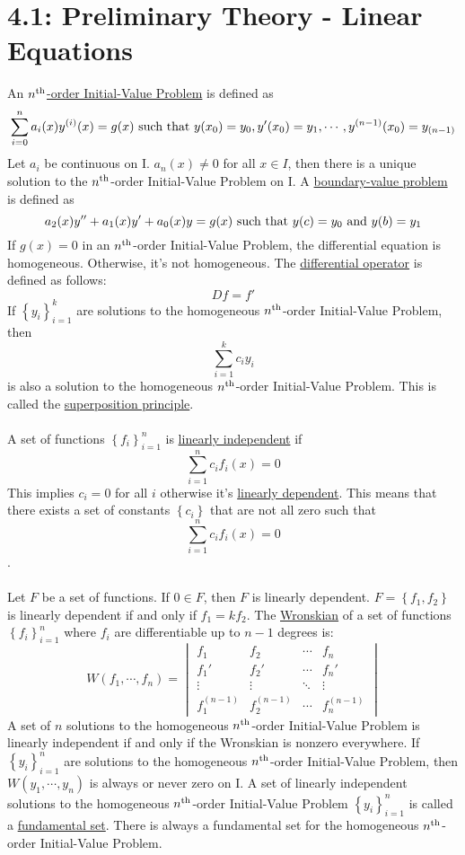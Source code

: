 \documentclass{article}
\begin{document}
\section*{4.1: Preliminary Theory - Linear Equations}
An \underline{\(n^{\textnormal{th}}\)-order Initial-Value Problem} is defined as
\[\sum_{i=0}^na_i(x)y^{(i)}(x)=g(x)\textnormal{ such that }y(x_0)=y_0, y'(x_0)=y_1,\cdots,y^{(n-1)}(x_0)=y_{(n-1)}\]
Let \(a_i\) be continuous on I. \(a_n(x)\neq 0\) for all \(x\in I\), then there is a unique solution to the \(n^{\textnormal{th}}\)-order Initial-Value Problem on I.
A \underline{boundary-value problem} is defined as
\[a_2(x)y''+a_1(x)y'+a_0(x)y=g(x)\textnormal{ such that }y(c)=y_0\textnormal{ and }y(b)=y_1\]
If \(g(x)=0\) in an \(n^{\textnormal{th}}\)-order Initial-Value Problem, the differential equation is homogeneous. Otherwise, it's not homogeneous. The \underline{differential operator} is defined as follows:
\[Df=f'\]
If \(\left\{y_i\right\}_{i=1}^k\) are solutions to the homogeneous \(n^{\textnormal{th}}\)-order Initial-Value Problem, then \[\sum_{i=1}^kc_iy_i\]
is also a solution to the homogeneous \(n^{\textnormal{th}}\)-order Initial-Value Problem. This is called the \underline{superposition principle}.\\\\
A set of functions \(\left\{f_i\right\}_{i=1}^n\) is \underline{linearly independent} if
\[\sum_{i=1}^nc_if_i(x)=0\]
This implies \(c_i=0\) for all \(i\) otherwise it's \underline{linearly dependent}. This means that there exists a set of constants \(\left\{c_i\right\}\) that are not all zero such that
\[\sum_{i=1}^nc_if_i(x)=0\].\\\\
Let \(F\) be a set of functions. If \(0\in F\), then \(F\) is linearly dependent. \(F=\left\{f_1,f_2\right\}\) is linearly dependent if and only if \(f_1=kf_2\). The \underline{Wronskian} of a set of functions \(\left\{f_i\right\}_{i=1}^n\) where \(f_i\) are differentiable up to \(n-1\) degrees is:
\[W(f_1,\cdots,f_n)=
\begin{vmatrix}
	f_1 & f_2 & \cdots & f_n \\
	f_1' & f_2' & \cdots & f_n' \\
	\vdots & \vdots & \ddots & \vdots \\
  f_1^{(n-1)} & f_2^{(n-1)} & \cdots & f_n^{(n-1)}
\end{vmatrix}
\]
A set of \(n\) solutions to the homogeneous \(n^{\textnormal{th}}\)-order Initial-Value Problem is linearly independent if and only if the Wronskian is nonzero everywhere. If \(\left\{y_i\right\}_{i=1}^n\) are solutions to the homogeneous \(n^{\textnormal{th}}\)-order Initial-Value Problem, then \(W(y_1,\cdots,y_n)\) is always or never zero on I. A set of linearly independent solutions to the homogeneous \(n^{\textnormal{th}}\)-order Initial-Value Problem \(\left\{y_i\right\}_{i=1}^n\) is called a \underline{fundamental set}. There is always a fundamental set for the homogeneous \(n^{\textnormal{th}}\)-order Initial-Value Problem.\\\\
\end{document}
